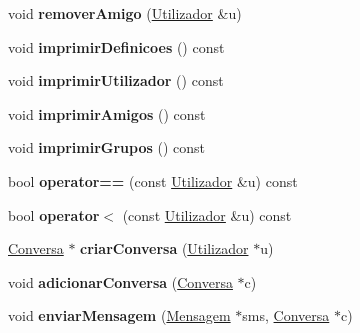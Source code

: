 \begin{DoxyCompactItemize}
\item 
\hypertarget{class_utilizador_aeea440a088526eea36ebcc27d6472e4f}{}void {\bfseries remover\+Amigo} (\hyperlink{class_utilizador}{Utilizador} \&u)\label{class_utilizador_aeea440a088526eea36ebcc27d6472e4f}

\item 
\hypertarget{class_utilizador_a1d4b8650dfe1d7a86f10192153e132d5}{}void {\bfseries imprimir\+Definicoes} () const \label{class_utilizador_a1d4b8650dfe1d7a86f10192153e132d5}

\item 
\hypertarget{class_utilizador_abf2814a0783cdc5ef39326981474767b}{}void {\bfseries imprimir\+Utilizador} () const \label{class_utilizador_abf2814a0783cdc5ef39326981474767b}

\item 
\hypertarget{class_utilizador_a433c888d3d5d669cda5fcb8d22832b37}{}void {\bfseries imprimir\+Amigos} () const \label{class_utilizador_a433c888d3d5d669cda5fcb8d22832b37}

\item 
\hypertarget{class_utilizador_ad4bf7b549a337d684e43189db2d0d57c}{}void {\bfseries imprimir\+Grupos} () const \label{class_utilizador_ad4bf7b549a337d684e43189db2d0d57c}

\item 
\hypertarget{class_utilizador_a051ebe3fbeadbb5b00a78da320a9f49e}{}bool {\bfseries operator==} (const \hyperlink{class_utilizador}{Utilizador} \&u) const \label{class_utilizador_a051ebe3fbeadbb5b00a78da320a9f49e}

\item 
\hypertarget{class_utilizador_a19b6202cece0cde531de23a1fd24b4c6}{}bool {\bfseries operator$<$} (const \hyperlink{class_utilizador}{Utilizador} \&u) const \label{class_utilizador_a19b6202cece0cde531de23a1fd24b4c6}

\item 
\hypertarget{class_utilizador_add4089c62dfb1b5ef5a9d320073e078f}{}\hyperlink{class_conversa}{Conversa} $\ast$ {\bfseries criar\+Conversa} (\hyperlink{class_utilizador}{Utilizador} $\ast$u)\label{class_utilizador_add4089c62dfb1b5ef5a9d320073e078f}

\item 
\hypertarget{class_utilizador_abd1eca6464a9825467763b1478cbc911}{}void {\bfseries adicionar\+Conversa} (\hyperlink{class_conversa}{Conversa} $\ast$c)\label{class_utilizador_abd1eca6464a9825467763b1478cbc911}

\item 
\hypertarget{class_utilizador_a7fba688a167c9ffedec736f21e28ea64}{}void {\bfseries enviar\+Mensagem} (\hyperlink{class_mensagem}{Mensagem} $\ast$sms, \hyperlink{class_conversa}{Conversa} $\ast$c)\label{class_utilizador_a7fba688a167c9ffedec736f21e28ea64}


\end{DoxyCompactItemize}

